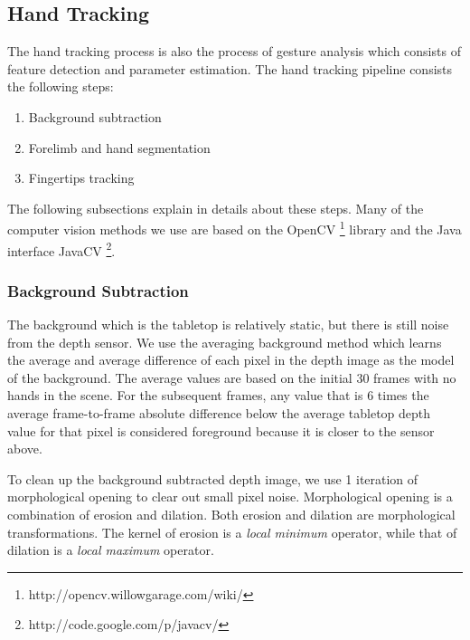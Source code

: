 \subsection{Hand Tracking}
The hand tracking process is also the process of gesture analysis which
consists of feature detection and parameter estimation. The hand tracking
pipeline consists the following steps:

\begin{enumerate}
  \item Background subtraction
  \item Forelimb and hand segmentation
  \item Fingertips tracking
\end{enumerate}

The following subsections explain in details about these steps. Many of the
computer vision methods we use are based on the OpenCV
\footnote{http://opencv.willowgarage.com/wiki/} library and the Java interface 
JavaCV \footnote{http://code.google.com/p/javacv/}.

\subsubsection{Background Subtraction}
The background which is the tabletop is relatively static, but there is still 
noise from the depth sensor. We use the averaging background method which
learns the average and average difference of each pixel in the depth image as
the model of the background. The average values are based on the initial 30
frames with no hands in the scene. For the subsequent frames, any value that is 
6 times the average frame-to-frame absolute difference below the average tabletop depth value for that pixel is considered 
foreground because it is closer to the sensor above.

To clean up the background subtracted depth image, we use 1 iteration of
morphological opening to clear out small pixel noise. Morphological opening is a
combination of erosion and dilation. Both erosion and dilation are morphological
transformations. The kernel of erosion is a \textit{local minimum} operator,
while that of dilation is a \textit{local maximum} operator.

